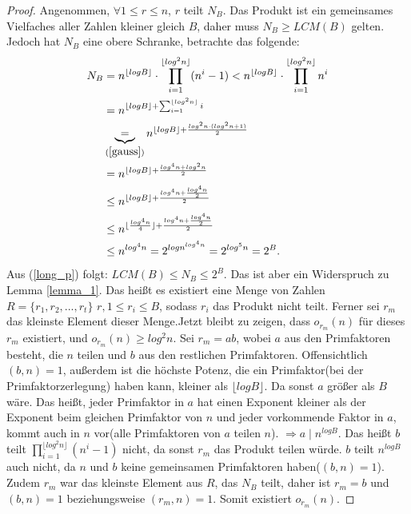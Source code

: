 \documentclass[12pt,oneside]{article}
\theoremstyle{remark}
\theoremstyle{definition}
\begin{document}
\begin{proof}
Angenommen, $\forall 1 \leq r \leq n$, $r$ teilt $N_{B}$. Das Produkt ist ein gemeinsames Vielfaches aller Zahlen kleiner gleich $B$, daher muss $N_{B} \geq LCM(B)$ gelten. Jedoch hat $N_{B}$ eine obere Schranke, betrachte das folgende:
\begin{equation}\label{long_p}
    \begin{split}
        \begin{aligned}
            N_{B} &= n^{\lfloor log B \rfloor } \cdot \prod_{i = 1}^{\lfloor log^2 n \rfloor} (n^i - 1)
                < n^{\lfloor log B \rfloor } \cdot \prod_{i = 1}^{\lfloor log^2 n \rfloor} n^i \\
                &= n^{\lfloor log B \rfloor + \sum_{i = 1}^{\lfloor log^2 n \rfloor } i}\\ 
                &\underbrace{=}_{(\ref{gauss})} n^{\lfloor log B \rfloor + \frac{log^2 n \cdot (log^2 n + 1)}{2}}  \\
                &= n^{\lfloor log B \rfloor + \frac{log^4 n + log^2 n}{2}}\\
                & \leq n^{\lfloor log B \rfloor + \frac{log^4 n + \frac{log^4 n}{2}}{2}}\\
                & \leq n^{\lfloor \frac{log^4 n}{4} \rfloor + \frac{log^4 n + \frac{log^4 n}{2}}{2}}\\
                & \leq n^{log^4 n} = 2^{log n^{log^4 n}} = 2^{log^5 n} = 2^{B}.
        \end{aligned}
    \end{split}
\end{equation}
Aus (\ref{long_p}) folgt: $LCM(B) \leq N_{B} \leq 2^B$. Das ist aber ein Widerspruch zu Lemma \ref{lemma_1}. Das heißt es existiert eine Menge von Zahlen $R = \{r_{1},r_{2},...,r_{t}\}$ $r, 1 \leq r_i \leq B$, sodass $r_{i}$ das Produkt nicht teilt. Ferner sei $r_{m}$ das kleinste Element dieser Menge.\newline\newline Jetzt bleibt zu zeigen, dass $o_{r_{m}}(n)$ für dieses $r_{m}$ existiert, und $o_{r_{m}}(n) \geq log^2 n$. Sei $r_{m} = ab $, wobei $a$ aus den Primfaktoren besteht, die $n$ teilen und $b$ aus den restlichen Primfaktoren. Offensichtlich $(b,n) = 1$, außerdem ist die höchste Potenz, die ein Primfaktor(bei der Primfaktorzerlegung) haben kann, kleiner als $\lfloor log B \rfloor$. Da sonst $a$ größer als $B$ wäre. Das heißt, jeder Primfaktor in $a$ hat einen Exponent kleiner als der Exponent beim gleichen Primfaktor von $n$ und jeder vorkommende Faktor in $a$, kommt auch in $n$ vor(alle Primfaktoren von $a$ teilen $n$).\newline
$\Rightarrow a \mid n^{log B}$.\newline
Das heißt $b$ teilt $\prod_{i = 1}^{\lfloor log^2 n \rfloor}(n^i - 1)$ nicht, da sonst $r_{m}$ das Produkt teilen würde. $b$ teilt $n^{log B}$ auch nicht, da $n$ und $b$ keine gemeinsamen Primfaktoren haben($(b,n) = 1$). Zudem $r_{m}$ war das kleinste Element aus $R$, das $N_{B}$ teilt, daher ist $r_{m}= b$ und $(b,n) = 1$ beziehungsweise $(r_{m},n) = 1$. Somit existiert $o_{r_{m}}(n)$.\newline\newline


\end{proof}
\end{document}
